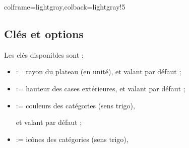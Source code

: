 \documentclass[11pt,a4paper]{ltxdoc}
\begin{document}
\begin{tcblisting}{colframe=lightgray,colback=lightgray!5}
\PlateauTrivialPursuit[Unite=0.5]
%
\PlateauTrivialPursuit[Rayon=4,HauteurCases=1.25] %

\PlateauTrivialPursuit[Unite=0.33]
%
\PlateauTrivialPursuit[Unite=0.33,VersionCourte]
\end{tcblisting}

\pagebreak

\subsection{Clés et options}

Les \textsf{clés} disponibles sont :

\begin{itemize}
	\item {} := rayon du plateau (en unité), et valant  par défaut ;
	\item {} := hauteur des cases extérieures, et valant  par défaut ;
	\item {} := couleurs des catégories (sens trigo),
	
	\hfill{}et valant  par défaut ;
	\item {} := icônes des catégories (sens trigo),
	

\end{itemize}
\end{document}
